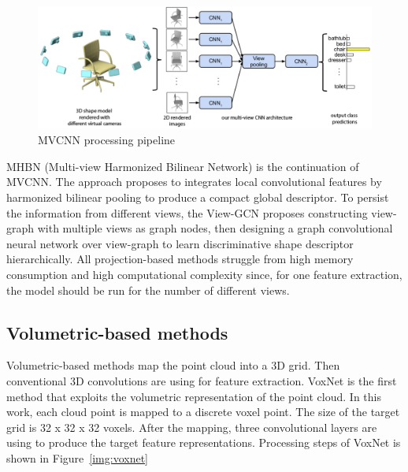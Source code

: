 \begin{figure}[htbp]
    \centerline{\includegraphics[scale=0.4]{Figures/mvcnn.png}}
    \caption{MVCNN processing pipeline  \parencite{su_multi-view_2015}}
    \label{img:mvcnn}
\end{figure}


MHBN \parencite{yu_multi-view_2018} (Multi-view Harmonized Bilinear Network) is the continuation of MVCNN. The approach proposes to integrates local convolutional features by harmonized bilinear pooling to produce a compact global descriptor.
To persist the information from different views, the View-GCN \parencite{wei_view-gcn_2020} proposes constructing view-graph with multiple views as graph nodes, then designing a graph convolutional neural network over view-graph to learn discriminative shape descriptor hierarchically.
All projection-based methods struggle from high memory consumption and high computational complexity since, for one feature extraction, the model should be run for the number of different views.

\subsection{Volumetric-based methods} 
Volumetric-based methods map the point cloud into a 3D grid. Then conventional 3D convolutions are using for feature extraction.
VoxNet \parencite{maturana_voxnet_2015} is the first method that exploits the volumetric representation of the point cloud. In this work, each cloud point is mapped to a discrete voxel point. The size of the target grid is 32 x 32 x 32 voxels. After the mapping, three convolutional layers are using to produce the target feature representations. Processing steps of VoxNet is shown in Figure~\ref{img:voxnet}

